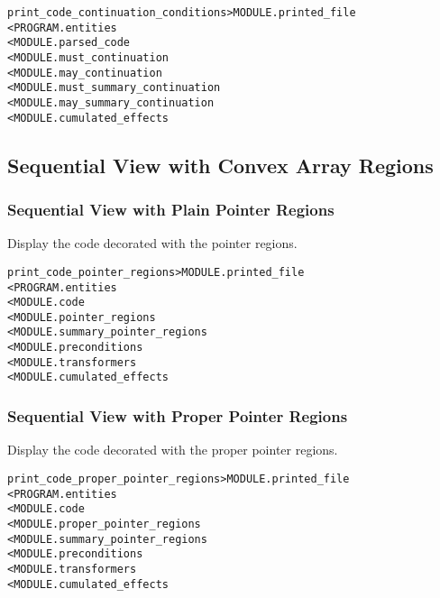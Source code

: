 \documentclass[a4paper]{report}
\newenvironment{PipsMake}{\begin{alltt}}{\end{alltt}}
\newenvironment{PipsPass}[1]{\label{pass:#1}}{}
\begin{document}
\begin{PipsMake}
print_code_continuation_conditions   > MODULE.printed_file
        < PROGRAM.entities
        < MODULE.parsed_code
        < MODULE.must_continuation
        < MODULE.may_continuation
        < MODULE.must_summary_continuation
        < MODULE.may_summary_continuation
        < MODULE.cumulated_effects
\end{PipsMake}


\subsection{Sequential View with Convex Array Regions}

\subsubsection{Sequential View with Plain Pointer Regions}
\label{sec:plain-regions}

\begin{PipsPass}{print_code_pointer_regions}
Display the code decorated with the pointer regions.
\end{PipsPass}

\begin{PipsMake}
print_code_pointer_regions              > MODULE.printed_file
        < PROGRAM.entities
        < MODULE.code
        < MODULE.pointer_regions
        < MODULE.summary_pointer_regions
        < MODULE.preconditions
        < MODULE.transformers
        < MODULE.cumulated_effects
\end{PipsMake}

\subsubsection{Sequential View with Proper Pointer Regions}

\begin{PipsPass}{print_code_proper_pointer_regions}
Display the code decorated with the proper pointer regions.
\end{PipsPass}

\begin{PipsMake}
print_code_proper_pointer_regions          > MODULE.printed_file
        < PROGRAM.entities
        < MODULE.code
        < MODULE.proper_pointer_regions
        < MODULE.summary_pointer_regions
        < MODULE.preconditions
        < MODULE.transformers
        < MODULE.cumulated_effects
\end{PipsMake}
\end{document}
